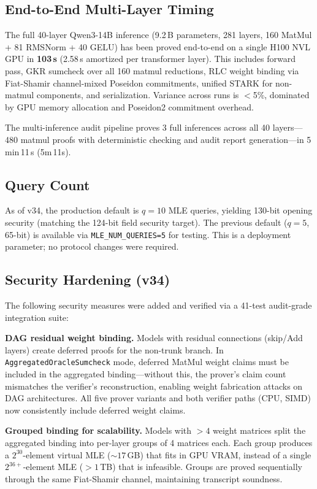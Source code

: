 \documentclass[10pt,twocolumn]{article}
\theoremstyle{definition}
\theoremstyle{remark}
\begin{document}
\subsection{End-to-End Multi-Layer Timing}

The full 40-layer Qwen3-14B inference (9.2\,B parameters, 281 layers,
160 MatMul + 81 RMSNorm + 40 GELU) has been proved end-to-end
on a single H100 NVL GPU in \textbf{103\,s} (2.58\,s amortized per
transformer layer). This includes forward pass, GKR sumcheck over
all 160 matmul reductions, RLC weight binding via Fiat-Shamir
channel-mixed Poseidon commitments, unified STARK for non-matmul
components, and serialization.
Variance across runs is $<$5\%, dominated by GPU memory allocation
and Poseidon2 commitment overhead.

The multi-inference audit pipeline proves 3 full inferences across
all 40 layers---480 matmul proofs with deterministic checking and
audit report generation---in 5\,min\,11\,s (5m\,11s).

\subsection{Query Count}

As of v34, the production default is $q=10$ MLE queries,
yielding 130-bit opening security (matching the 124-bit field
security target).
The previous default ($q=5$, 65-bit) is available via
\texttt{MLE\_NUM\_QUERIES=5} for testing.
This is a deployment parameter; no protocol changes were required.

\subsection{Security Hardening (v34)}

The following security measures were added and verified via a
41-test audit-grade integration suite:

\textbf{DAG residual weight binding.}
Models with residual connections (skip/Add layers) create deferred
proofs for the non-trunk branch.  In \texttt{AggregatedOracleSumcheck}
mode, deferred MatMul weight claims must be included in the aggregated
binding---without this, the prover's claim count mismatches the
verifier's reconstruction, enabling weight fabrication attacks on
DAG architectures.  All five prover variants and both verifier paths
(CPU, SIMD) now consistently include deferred weight claims.

\textbf{Grouped binding for scalability.}
Models with $>4$ weight matrices split the aggregated binding into
per-layer groups of 4 matrices each.  Each group produces a
$2^{30}$-element virtual MLE (${\sim}17$\,GB) that fits in GPU VRAM,
instead of a single $2^{36+}$-element MLE ($>1$\,TB) that is
infeasible.  Groups are proved sequentially through the same
Fiat-Shamir channel, maintaining transcript soundness.
\end{document}
